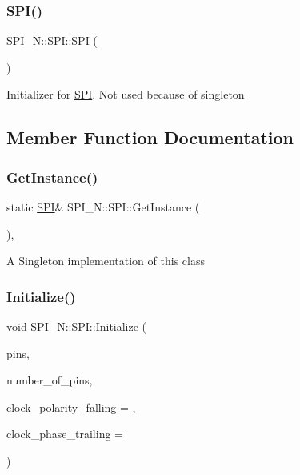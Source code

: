 \subsubsection{\texorpdfstring{S\+P\+I()}{SPI()}\hspace{0.1cm}{\footnotesize\ttfamily [2/2]}}
{\footnotesize\ttfamily S\+P\+I\+\_\+\+N\+::\+S\+P\+I\+::\+S\+PI (\begin{DoxyParamCaption}{ }\end{DoxyParamCaption})\hspace{0.3cm}{\ttfamily [private]}}

Initializer for \hyperlink{class_s_p_i___n_1_1_s_p_i}{S\+PI}. Not used because of singleton 

\subsection{Member Function Documentation}
\hypertarget{class_s_p_i___n_1_1_s_p_i_abc266ff9d817b8d4437d1da47fe8e7ae}{}\label{class_s_p_i___n_1_1_s_p_i_abc266ff9d817b8d4437d1da47fe8e7ae} 
\subsubsection{\texorpdfstring{Get\+Instance()}{GetInstance()}}
{\footnotesize\ttfamily static \hyperlink{class_s_p_i___n_1_1_s_p_i}{S\+PI}\& S\+P\+I\+\_\+\+N\+::\+S\+P\+I\+::\+Get\+Instance (\begin{DoxyParamCaption}{ }\end{DoxyParamCaption})\hspace{0.3cm}{\ttfamily [inline]}, {\ttfamily [static]}}

A Singleton implementation of this class \hypertarget{class_s_p_i___n_1_1_s_p_i_ab0517cd53e32d224a0171e6eeb200870}{}\label{class_s_p_i___n_1_1_s_p_i_ab0517cd53e32d224a0171e6eeb200870} 
\subsubsection{\texorpdfstring{Initialize()}{Initialize()}}
{\footnotesize\ttfamily void S\+P\+I\+\_\+\+N\+::\+S\+P\+I\+::\+Initialize (\begin{DoxyParamCaption}\item[{\hyperlink{struct_s_p_i___n_1_1_p_i_n}{P\+IN} $\ast$}]{pins,  }\item[{uint8\+\_\+t}]{number\+\_\+of\+\_\+pins,  }\item[{bool}]{clock\+\_\+polarity\+\_\+falling = {},  }\item[{bool}]{clock\+\_\+phase\+\_\+trailing = {} }\end{DoxyParamCaption})}

